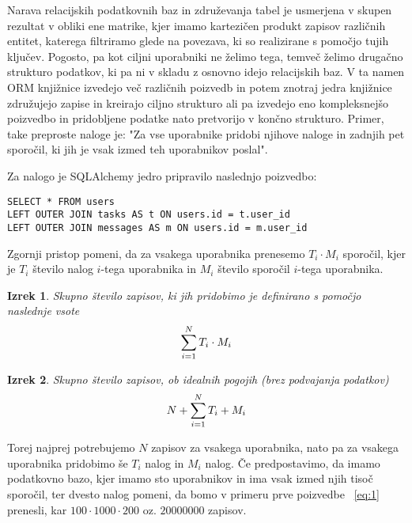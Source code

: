 \documentclass[a4paper,12pt,openright]{book}
\newtheorem{izrek}{Izrek}[chapter]
\begin{document}
    Narava relacijskih podatkovnih baz in združevanja tabel je usmerjena v skupen rezultat v obliki ene matrike, kjer imamo kartezičen produkt zapisov različnih entitet, katerega filtriramo glede na povezava, ki so realizirane s pomočjo tujih ključev. Pogosto, pa kot ciljni uporabniki ne želimo tega, temveč želimo drugačno strukturo podatkov, ki pa ni v skladu z osnovno idejo relacijskih baz. V ta namen ORM knjižnice izvedejo več različnih poizvedb in potem znotraj jedra knjižnice združujejo zapise in kreirajo ciljno strukturo ali pa izvedejo eno kompleksnejšo poizvedbo in pridobljene podatke nato pretvorijo v končno strukturo. Primer, take preproste naloge je: "Za vse uporabnike pridobi njihove naloge in zadnjih pet sporočil, ki jih je vsak izmed teh uporabnikov poslal".

    \noindent
    Za nalogo je SQLAlchemy jedro pripravilo naslednjo poizvedbo:
    \begin{verbatim}
SELECT * FROM users
LEFT OUTER JOIN tasks AS t ON users.id = t.user_id
LEFT OUTER JOIN messages AS m ON users.id = m.user_id
    \end{verbatim}

    \noindent
    Zgornji pristop pomeni, da za vsakega uporabnika prenesemo $T_i \cdot M_i$ sporočil, kjer je $T_i$ število nalog $i$-tega uporabnika in $M_i$ število sporočil $i$-tega uporabnika.

    \begin{izrek}
        \label{iz:1}
        Skupno število zapisov, ki jih pridobimo je definirano s pomočjo naslednje vsote
        \begin{equation}
            \Large \sum_{i=1}^{N} T_i \cdot M_i
        \label{eq:1}
        \end{equation}
    \end{izrek}

    \begin{izrek}
        \label{iz:2}
        Skupno število zapisov, ob idealnih pogojih (brez podvajanja podatkov)
        \begin{equation}
            \Large N + \sum_{i=1}^{N} T_i + M_i
        \label{eq:2}
        \end{equation}
    \end{izrek}

    \noindent
    Torej najprej potrebujemo $N$ zapisov za vsakega uporabnika, nato pa za vsakega uporabnika pridobimo še $T_i$ nalog in $M_i$ nalog. Če predpostavimo, da imamo podatkovno bazo, kjer imamo sto uporabnikov in ima vsak izmed njih tisoč sporočil, ter dvesto nalog pomeni, da bomo v primeru prve poizvedbe ~\eqref{eq:1} prenesli, kar $100 \cdot 1000 \cdot 200$ oz. $\num{20000000}$ zapisov.
\end{document}
